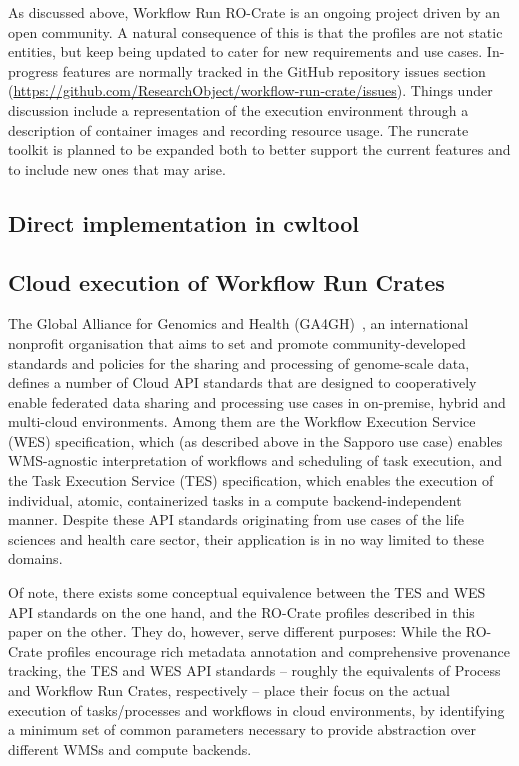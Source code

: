 \documentclass[10pt,letterpaper]{article}
\begin{document}
As discussed above, Workflow Run RO-Crate is an ongoing project driven by an open community.
A natural consequence of this is that the profiles are not static entities, but keep being updated to cater for new requirements and use cases.
In-progress features are normally tracked in the GitHub repository issues section (\url{https://github.com/ResearchObject/workflow-run-crate/issues}).
Things under discussion include a representation of the execution environment through a description of container images and recording resource usage.
The runcrate toolkit is planned to be expanded both to better support the current features and to include new ones that may arise.

\hypertarget{direct-implementation-in-cwltool}{%
\subsection{Direct implementation in cwltool}\label{direct-implementation-in-cwltool}}

\hypertarget{cloud-execution-of-workflow-run-crates}{%
\subsection{Cloud execution of Workflow Run Crates}\label{cloud-execution-of-workflow-run-crates}}

The Global Alliance for Genomics and Health (GA4GH)~\cite{GA4GH}, an international nonprofit organisation that aims to set and promote community-developed standards and policies for the sharing and processing of genome-scale data, defines a number of Cloud API standards that are designed to cooperatively enable federated data sharing and processing use cases in on-premise, hybrid and multi-cloud environments.
Among them are the Workflow Execution Service (WES) specification, which (as described above in the Sapporo use case) enables WMS-agnostic interpretation of workflows and scheduling of task execution, and the Task Execution Service (TES) specification, which enables the execution of individual, atomic, containerized tasks in a compute backend-independent manner.
Despite these API standards originating from use cases of the life sciences and health care sector, their application is in no way limited to these domains.

Of note, there exists some conceptual equivalence between the TES and WES API standards on the one hand, and the RO-Crate profiles described in this paper on the other.
They do, however, serve different purposes:
While the RO-Crate profiles encourage rich metadata annotation and comprehensive provenance tracking, the TES and WES API standards --
roughly the equivalents of Process and Workflow Run Crates, respectively -- place their focus on the actual execution of tasks/processes and workflows in cloud environments, by identifying a minimum set of common parameters necessary to provide abstraction over different WMSs and compute backends.
\end{document}
